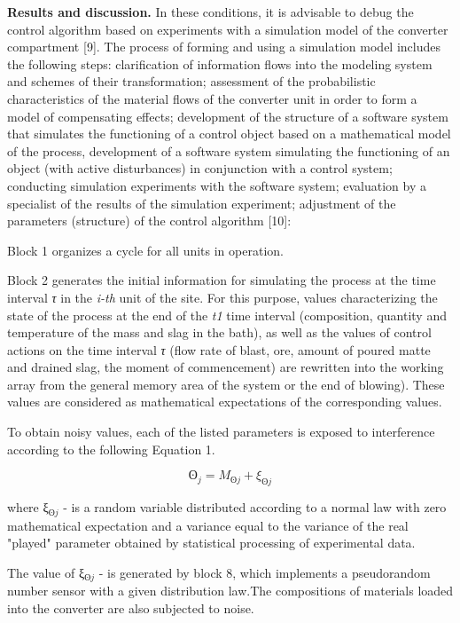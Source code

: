 \begin{multicols}{2}
{\bfseries Results and discussion.} In these conditions, it is advisable to
debug the control algorithm based on experiments with a simulation model
of the converter compartment {[}9{]}. The process of forming and using a
simulation model includes the following steps: clarification of
information flows into the modeling system and schemes of their
transformation; assessment of the probabilistic characteristics of the
material flows of the converter unit in order to form a model of
compensating effects; development of the structure of a software system
that simulates the functioning of a control object based on a
mathematical model of the process, development of a software system
simulating the functioning of an object (with active disturbances) in
conjunction with a control system; conducting simulation experiments
with the software system; evaluation by a specialist of the results of
the simulation experiment; adjustment of the parameters (structure) of
the control algorithm {[}10{]}:

Block 1 organizes a cycle for all units in operation.

Block 2 generates the initial information for simulating the process at
the time interval \emph{τ} in the \emph{i-th} unit of the site. For this
purpose, values characterizing the state of the process at the end of
the \emph{t1} time interval (composition, quantity and temperature of
the mass and slag in the bath), as well as the values of control actions
on the time interval \emph{τ} (flow rate of blast, ore, amount of poured
matte and drained slag, the moment of commencement) are rewritten into
the working array from the general memory area of the system or the end
of blowing). These values are considered as mathematical expectations of
the corresponding values.

To obtain noisy values, each of the listed parameters is exposed to
interference according to the following Equation 1.

\begin{equation}
\text{ʘ}_{j}=M_{\text{ʘ}j}+ξ_{\text{ʘ}j}
\end{equation}

where ξ\(_{\text{ʘ}j}\) - is a random variable distributed according to a
normal law with zero mathematical expectation and a variance equal to
the variance of the real "played" parameter obtained by statistical
processing of experimental data.

The value of ξ\(_{\text{ʘ}j}\) - is generated by block 8, which implements a
pseudorandom number sensor with a given distribution law.The
compositions of materials loaded into the converter are also subjected
to noise.


\end{multicols}
